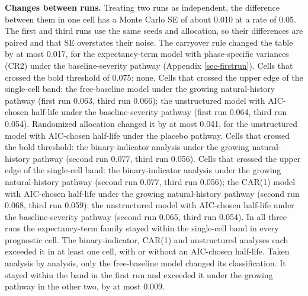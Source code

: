 \documentclass[
  11pt,
]{article}
\newcounter{none} %
\begin{document}
\textbf{Changes between runs.} Treating two runs as independent, the
difference between them in one cell has a Monte Carlo SE of about
0.010 at a rate of 0.05. The first and third runs use the same seeds
and allocation, so their differences are paired and that SE overstates
their noise. The carryover rule changed the table by at most
0.017, for the expectancy-term model with phase-specific variances (CR2) under the baseline-severity pathway (Appendix \ref{sec-firstrun}). Cells that
crossed the bold threshold of 0.075:
none. Cells that crossed the upper edge
of the single-cell band: the free-baseline model under the growing natural-history pathway (first run 0.063, third run 0.066); the unstructured model with AIC-chosen half-life under the baseline-severity pathway (first run 0.064, third run 0.054).
Randomized allocation changed it by at most 0.041, for the unstructured model with AIC-chosen half-life under the placebo pathway.
Cells that crossed the bold threshold:
the binary-indicator analysis under the growing natural-history pathway (second run 0.077, third run 0.056). Cells that crossed the upper edge
of the single-cell band: the binary-indicator analysis under the growing natural-history pathway (second run 0.077, third run 0.056); the CAR(1) model with AIC-chosen half-life under the growing natural-history pathway (second run 0.068, third run 0.059); the unstructured model with AIC-chosen half-life under the baseline-severity pathway (second run 0.065, third run 0.054).
In all three runs the expectancy-term family stayed within the
single-cell band in every prognostic cell. The binary-indicator, CAR(1)
and unstructured analyses each exceeded it in at least one cell, with
or without an AIC-chosen half-life. Taken analysis by analysis, only
the free-baseline model changed its classification. It stayed within
the band in the first run and exceeded it under the growing pathway in
the other two, by at most
0.009.
\end{document}
